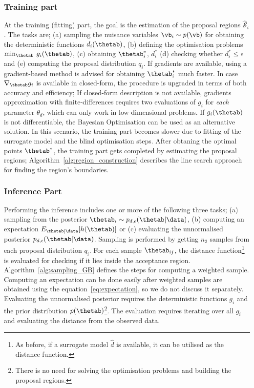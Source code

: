 \subsubsection*{Training part}
\noindent
At the training (fitting) part, the goal is the estimation of the
proposal regions $\mathcal{\hat{S}}_i$. The tasks are; (a) sampling
the nuisance variables $\vb_i \sim p(\vb)$ for obtaining the
deterministic functions $d_i(\thetab)$, (b) defining the optimisation
problems $\min_{\thetab} \: g_i(\thetab)$, (c) obtaining
$\thetab_i^*$, $d_i^*$ (d) checking whether $d_i^* \leq \epsilon$ and
(e) computing the proposal distribution $q_i$. If gradients are
available, using a gradient-based method is advised for obtaining
$\thetab_i^*$ much faster. In case $\nabla_{\thetab} g_i$ is available
in closed-form, the procedure is upgraded in terms of both accuracy
and efficiency; If closed-form description is not available, gradients
approximation with finite-differences requires two evaluations of
$g_i$ for \emph{each} parameter $\theta_d$, which can only work in
low-dimensional problems. If $g_i(\thetab)$ is not differentiable, the
Bayesian Optimisation can be used as an alternative solution. In this
scenario, the training part becomes slower due to fitting of the
surrogate model and the blind optimisation steps. After obtaning the
optimal points $\thetab^*$, the training part gets completed by
estimating the proposal regions;
Algorithm~\ref{alg:region_construction} describes the line search
approach for finding the region's boundaries.

\subsubsection*{Inference Part}
Performing the inference includes one or more of the following three
tasks; (a) sampling from the posterior
$ \thetab_i \sim p_{d, \epsilon}(\thetab|\data)$, (b) computing an
expectation $E_{\thetab|\data}[h(\thetab)]$ or (c) evaluating the
unnormalised posterior $p_{d, \epsilon}(\thetab|\data)$. Sampling is
performed by getting $n_2$ samples from each proposal distribution
$q_i$. For each sample $\thetab_{ij}$, the distance
function\footnote{As before, if a surrogate model $\hat{d}$ is
  available, it can be utilised as the distance function.} is
evaluated for checking if it lies inside the acceptance
region. Algorithm~\ref{alg:sampling_GB} defines the steps for
computing a weighted sample. Computing an expectation can be done
easily after weighted samples are obtained using the
equation~\ref{eq:expectation}, so we do not discuss it
separately. Evaluating the unnormalised posterior requires the
deterministic functions $g_i$ and the prior distribution
$p(\thetab)$\footnote{There is no need for solving the optimisation
  problems and building the proposal regions.}. The evaluation
requires iterating over all $g_i$ and evaluating the distance from the
observed data.

